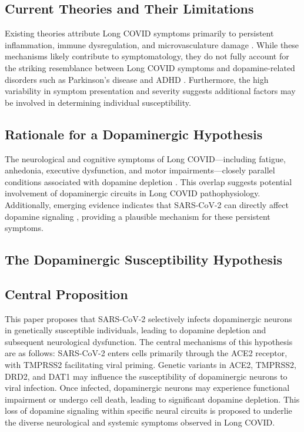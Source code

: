 \documentclass[11pt]{article}
\begin{document}
\subsection*{Current Theories and Their Limitations}
Existing theories attribute Long COVID symptoms primarily to persistent inflammation, immune dysregulation, and microvasculature damage \citep{yang2021choroidplexus, crunfli2023astrocytes}. While these mechanisms likely contribute to symptomatology, they do not fully account for the striking resemblance between Long COVID symptoms and dopamine-related disorders such as Parkinson's disease and ADHD \citep{devine2022parkinsonscovid, gizer2009adhdgenes}. Furthermore, the high variability in symptom presentation and severity suggests additional factors may be involved in determining individual susceptibility.

\subsection*{Rationale for a Dopaminergic Hypothesis}
The neurological and cognitive symptoms of Long COVID—including fatigue, anhedonia, executive dysfunction, and motor impairments—closely parallel conditions associated with dopamine depletion \citep{brundin2020parkinsonmanagement, cappelletti2023dopamineblock}. This overlap suggests potential involvement of dopaminergic circuits in Long COVID pathophysiology. Additionally, emerging evidence indicates that SARS-CoV-2 can directly affect dopamine signaling \citep{lee2024dopamineinfection}, providing a plausible mechanism for these persistent symptoms.

\begin{center}
\section*{The Dopaminergic Susceptibility Hypothesis}
\end{center}

\subsection*{Central Proposition}
This paper proposes that SARS-CoV-2 selectively infects dopaminergic neurons in genetically susceptible individuals, leading to dopamine depletion and subsequent neurological dysfunction. The central mechanisms of this hypothesis are as follows: SARS-CoV-2 enters cells primarily through the ACE2 receptor, with TMPRSS2 facilitating viral priming. Genetic variants in ACE2, TMPRSS2, DRD2, and DAT1 may influence the susceptibility of dopaminergic neurons to viral infection. Once infected, dopaminergic neurons may experience functional impairment or undergo cell death, leading to significant dopamine depletion. This loss of dopamine signaling within specific neural circuits is proposed to underlie the diverse neurological and systemic symptoms observed in Long COVID.
\end{document}
